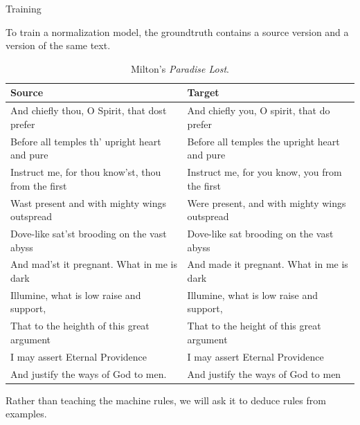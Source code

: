 \documentclass[aspectratio=169]{beamer}
\begin{document}
    \begin{frame}{Training}

        To train a normalization model, the groundtruth contains a source version and a version of the same text.
        
        \begin{table}\tiny
            \begin{tabular}{l|l}
                \toprule
                \textbf{Source} & \textbf{Target}\\
                \midrule
        	And chiefly thou, O Spirit, that dost prefer &
                And chiefly you, O spirit, that do prefer\\
        	Before all temples th' upright heart and pure &
                Before all temples the upright heart and pure \\
        	Instruct me, for thou know'st, thou from the first &
                Instruct me, for you know, you from the first \\
        	Wast present and with mighty wings outspread &
                Were present, and with mighty wings outspread \\
        	Dove-like sat'st brooding on the vast abyss &
                Dove-like sat brooding on the vast abyss  \\
        	And mad'st it pregnant. What in me is dark & 
                And made it pregnant. What in me is dark \\
        	Illumine, what is low raise and support, &
                Illumine, what is low raise and support,\\
        	That to the heighth of this great argument &
                That to the height of this great argument\\
        	I may assert Eternal Providence &
                I may assert Eternal Providence \\
        	And justify the ways of God to men. &
                And justify the ways of God to men \\
                \bottomrule
            \end{tabular}
            \caption{Milton's \textit{Paradise Lost}.}
        \label{tab:milton}
        \end{table}

        Rather than teaching the machine rules, we will ask it to deduce rules from examples.
        
    \end{frame}
\end{document}
